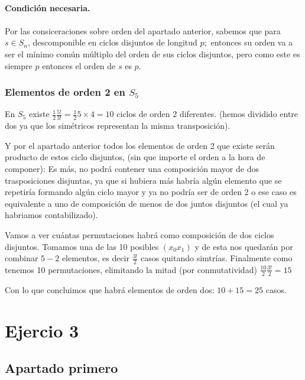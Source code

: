 \documentclass[12pt]{article}
\begin{document}
\paragraph{}
\textbf{Condición necesaria.}\paragraph{}
Por las consiceraciones sobre orden del apartado anterior, sabemos que para $s \in S_n$, 
descomponible en ciclos disjuntos de longitud $p;$ entonces su orden 
va a ser el mínimo común múltiplo del orden de sus ciclos disjuntos, pero como este es
siempre $p$ entonces el orden de $s$ es $p.$

\subsubsection*{Elementos de orden 2 en $S_5$}

En $S_5$ existe $\frac{1}{2}\frac{5!}{3!} = \frac{1}{2}5\times 4 = 10$  ciclos de orden 2 diferentes.
(hemos dividido entre dos ya que los simétricos representan la misma transposición). 

Y por el apartado anterior todos los elementos de orden 2 que existe serán producto de estos ciclo disjuntos, 
(sin que importe el orden a la hora de componer): 
Es más, no podrá contener una composición mayor de dos trasposiciones disjuntas, 
ya que si hubiera más habría algún elemento que se repetiría formando algún
ciclo mayor y ya no podría ser de orden 2 o ese caso es equivalente a uno de composición
de menos de dos juntos disjuntos (el cual ya habriamos contabilizado).

Vamos a ver cuántas permutaciones habrá como composición de dos ciclos disjuntos. 
Tomamos una de las 10 posibles $(x_0 x_1)$ y de esta nos quedarán por combinar $5-2$ elementos,
es decir $\frac{3!}{2}$ casos quitando simtrías.
Finalmente como tenemos 10 permutaciones, elimitando la mitad (por conmutatividad) $\frac{10}{2} \frac{3!}{2} = 15$ 



Con lo que concluimos que habrá elementos de orden dos: $10 + 15 = 25$ casos.

\newpage

\section{Ejercio 3}
\subsection{Apartado primero}
\end{document}
